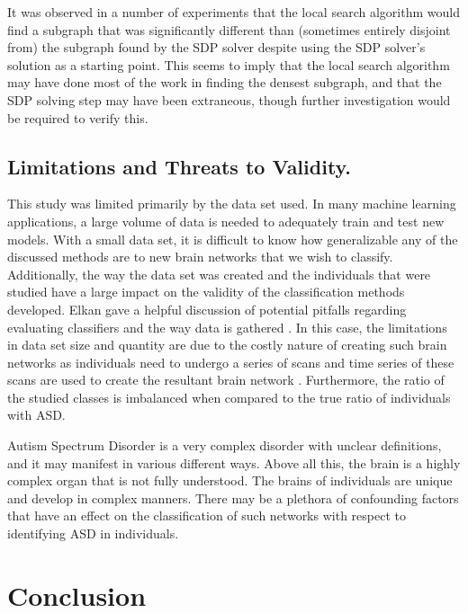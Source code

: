 \documentclass[sigconf]{acmart}
\begin{document}
It was observed in a number of experiments that the local search algorithm would find a subgraph that was significantly different than (sometimes entirely disjoint from) the subgraph found by the SDP solver despite using the SDP solver's solution as a starting point.
This seems to imply that the local search algorithm may have done most of the work in finding the densest subgraph, and that the SDP solving step may have been extraneous, though further investigation would be required to verify this.

\subsection{Limitations and Threats to Validity.}
This study was limited primarily by the data set used.
In many machine learning applications, a large volume of data is needed to adequately train and test new models.
With a small data set, it is difficult to know how generalizable any of the discussed methods are to new brain networks that we wish to classify.
Additionally, the way the data set was created and the individuals that were studied have a large impact on the validity of the classification methods developed.
Elkan gave a helpful discussion of potential pitfalls regarding evaluating classifiers and the way data is gathered \cite{elkan2012}.
In this case, the limitations in data set size and quantity are due to the costly nature of creating such brain networks as individuals need to undergo a series of scans and time series of these scans are used to create the resultant brain network \cite{lanciano2020}.
Furthermore, the ratio of the studied classes is imbalanced when compared to the true ratio of individuals with ASD.

Autism Spectrum Disorder is a very complex disorder with unclear definitions, and it may manifest in various different ways.
Above all this, the brain is a highly complex organ that is not fully understood.
The brains of individuals are unique and develop in complex manners.
There may be a plethora of confounding factors that have an effect on the classification of such networks with respect to identifying ASD in individuals.







\section{Conclusion}
\end{document}
